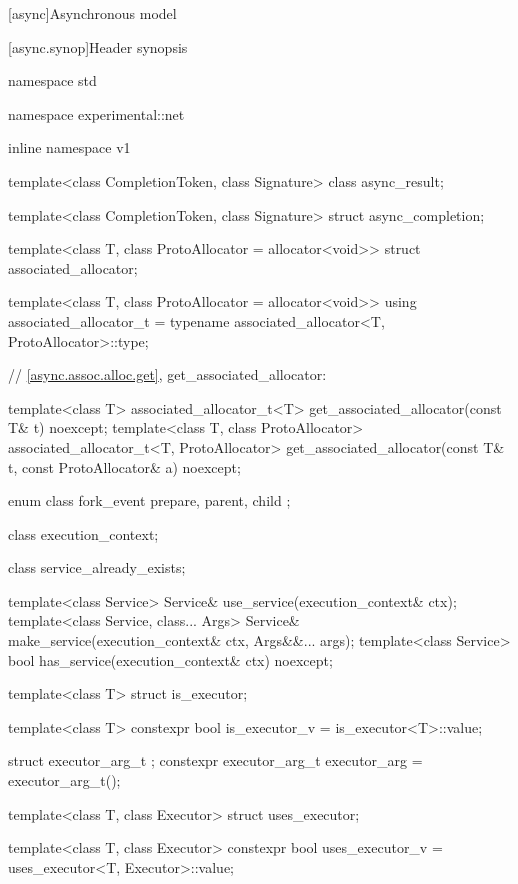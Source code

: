 
[async]{Asynchronous model}


%
[async.synop]{Header  synopsis}

%
%
%
%
\begin{codeblock}
namespace std {
namespace experimental::net {
inline namespace v1 {

  template<class CompletionToken, class Signature>
    class async_result;

  template<class CompletionToken, class Signature>
    struct async_completion;

  template<class T, class ProtoAllocator = allocator<void>>
    struct associated_allocator;

  template<class T, class ProtoAllocator = allocator<void>>
    using associated_allocator_t = typename associated_allocator<T, ProtoAllocator>::type;

  // \ref{async.assoc.alloc.get}, get_associated_allocator:

  template<class T>
    associated_allocator_t<T> get_associated_allocator(const T& t) noexcept;
  template<class T, class ProtoAllocator>
    associated_allocator_t<T, ProtoAllocator>
      get_associated_allocator(const T& t, const ProtoAllocator& a) noexcept;

  enum class fork_event {
    prepare,
    parent,
    child
  };

  class execution_context;

  class service_already_exists;

  template<class Service> Service& use_service(execution_context& ctx);
  template<class Service, class... Args> Service&
    make_service(execution_context& ctx, Args&&... args);
  template<class Service> bool has_service(execution_context& ctx) noexcept;

  template<class T> struct is_executor;

  template<class T>
    constexpr bool is_executor_v = is_executor<T>::value;

  struct executor_arg_t { };
  constexpr executor_arg_t executor_arg = executor_arg_t();

  template<class T, class Executor> struct uses_executor;

  template<class T, class Executor>
    constexpr bool uses_executor_v = uses_executor<T, Executor>::value;

}}}
\end{codeblock}
